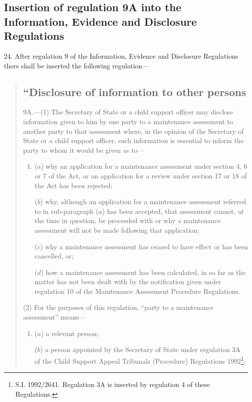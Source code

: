 \documentclass[a4paper]{article}
\begin{document}
\subsection[24. Insertion of regulation 9A into the Information, Evidence and Disclosure Regulations]{Insertion of regulation 9A into the Information, Evidence and Disclosure Regulations}

24.  After regulation 9 of the Information, Evidence and Disclosure Regulations there shall be inserted the following regulation—
\begin{quotation}
\subsection*{“Disclosure of information to other persons}

9A.—(1) The Secretary of State or a child support officer may disclose information given to him by one party to a maintenance assessment to another party to that assessment where, in the opinion of the Secretary of State or a child support officer, such information is essential to inform the party to whom it would be given as to—
\begin{enumerate}\item[]
($a$) why an application for a maintenance assessment under section 4, 6 or 7 of the Act, or an application for a review under section 17 or 18 of the Act has been rejected;

($b$) why, although an application for a maintenance assessment referred to in sub-paragraph ($a$) has been accepted, that assessment cannot, at the time in question, be proceeded with or why a maintenance assessment will not be made following that application;

($c$) why a maintenance assessment has ceased to have effect or has been cancelled, or;

($d$) how a maintenance assessment has been calculated, in so far as the matter has not been dealt with by the notification given under regulation 10 of the Maintenance Assessment Procedure Regulations.
\end{enumerate}

(2) For the purposes of this regulation, “party to a maintenance assessment” means—
\begin{enumerate}\item[]
($a$) a relevant person;

($b$) a person appointed by the Secretary of State under regulation 3A of the Child Support Appeal Tribunals (Procedure) Regulations 1992\footnote{\frenchspacing S.I. 1992/2641. Regulation 3A is inserted by regulation 4 of these Regulations.};


\end{enumerate}
\end{quotation}
\end{document}
